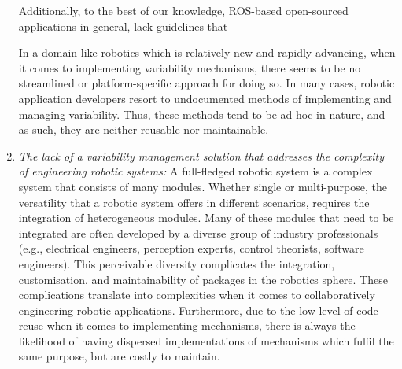 \documentclass[conference]{IEEEtran}
\begin{document}
\begin{enumerate}
    Additionally, to the best of our knowledge, ROS-based open-sourced applications in general, lack guidelines that
    
    In a domain like robotics which is relatively new and rapidly advancing, when it comes to implementing variability mechanisms, there seems to be no streamlined or platform-specific approach for doing so. In many cases, robotic application developers resort to undocumented methods of implementing and managing variability. Thus, these methods tend to be ad-hoc in nature, and as such, they are neither reusable nor maintainable.
    
    \item \textit{The lack of a variability management solution that addresses the complexity of engineering robotic systems: }A full-fledged robotic system is a complex system that consists of many modules. Whether single or multi-purpose, the versatility that a robotic system offers in different scenarios, requires the integration of heterogeneous modules. Many of these modules that need to be integrated are often developed by a diverse group of industry professionals (e.g., electrical engineers, perception experts, control theorists, software engineers). This perceivable diversity complicates the integration, customisation, and maintainability of packages in the robotics sphere. These complications translate into complexities when it comes to collaboratively engineering robotic applications. Furthermore, due to the low-level of code reuse when it comes to implementing mechanisms, there is always the likelihood of having dispersed implementations of mechanisms which fulfil the same purpose, but are costly to maintain.
\end{enumerate}
\end{document}
